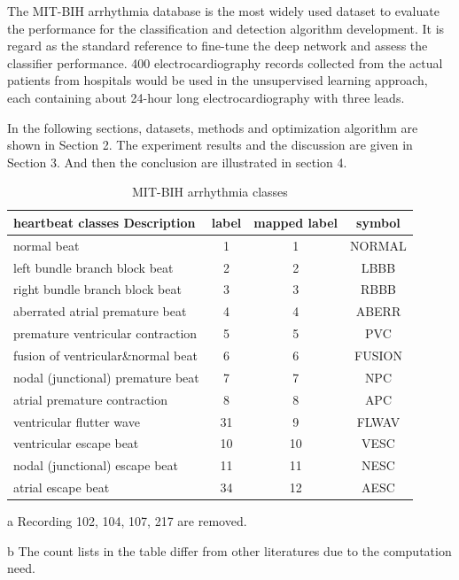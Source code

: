 \documentclass[conference]{IEEEtran}
\begin{document}
The MIT-BIH arrhythmia database \cite{Goldberger} is the most widely used dataset to evaluate the performance for the classification and detection algorithm development. It is regard as the standard reference to fine-tune the deep network and assess the classifier performance. 400 electrocardiography records collected from the actual patients from hospitals would be used in the unsupervised learning approach, each containing about 24-hour long electrocardiography with three leads.

In the following sections, datasets, methods and optimization algorithm are shown in Section 2. The experiment results and the discussion are given in Section 3. And then the conclusion are illustrated in section 4.

\begin{table}[!htbp]
\small
\begin{flushleft}
\newsavebox{\tablebox}
\begin{lrbox}{\tablebox}
\begin{threeparttable}
\caption{ MIT-BIH arrhythmia classes}
\label{table1}
\begin{tabular}{lccc}
\hline
heartbeat classes Description         &  label  & mapped label  & symbol  \\
\hline    
normal beat &   1   &	1		&	NORMAL\\
left bundle branch block beat &   2	&	 2		&	LBBB  \\
right bundle branch block beat &   3	&	 3		&	RBBB  \\
aberrated atrial premature beat &    4 	&	 4		&	ABERR \\
premature ventricular contraction    &   5	&	 5		&	PVC   \\
fusion of ventricular\&normal beat    &   6	&	 6		&	FUSION\\
nodal (junctional) premature beat     &    7	&	 7		&	NPC   \\
atrial premature contraction &   8	&	 8		&	APC   \\
ventricular flutter wave  &  31 &  9		&	FLWAV \\
ventricular escape beat  &  10&	 10	&	VESC  \\
nodal (junctional) escape beat   &   11	&	 11	&	NESC  \\
atrial escape beat  &  34	&	 12	&	AESC  \\
\hline
\end{tabular}
\begin{tablenotes}
\item [a] Recording 102, 104, 107, 217 are removed.
\item [b] The count lists in the table differ from other literatures due to the computation need.
\end{tablenotes}
\end{threeparttable}
\end{lrbox}
\scalebox{0.91}{\usebox{\tablebox}}
\end{flushleft}
\end{table}
\end{document}
